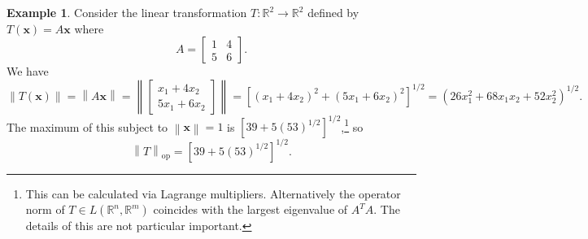 \documentclass{article}
\newcommand{\R}{\mathbb{R}}
\newcommand{\x}{\mathbf{x}}
\newcommand{\norm}[1]{\left\lVert#1\right\rVert}
\theoremstyle{definition}
\newtheorem{example}{Example}[section]
\begin{document}
\begin{example}
	Consider the linear transformation $ T:\R^2\to\R^2 $ defined by $ T(\x)=A\x $ where $$ A = \begin{bmatrix}
		1 & 4\\ 5 & 6
	\end{bmatrix}. $$
We have 
$$\norm{T(\x)}=\norm{A\x}=\norm{\begin{bmatrix}
		x_1 + 4x_2\\ 5x_1 + 6x_2
\end{bmatrix}} = \left[(x_1 + 4x_2)^2 + (5x_1 + 6x_2)^2\right]^{1/2} = \left(26x_1^2 + 68 x_1x_2 + 52x_2^2\right)^{1/2}. $$ The maximum of this subject to $ \norm{\x} = 1 $ is $ \left[39+5(53)^{1/2}\right]^{1/2}$,\footnote{This can be calculated via Lagrange multipliers. Alternatively the operator norm of $ T\in L(\R^n,\R^m) $ coincides with the largest eigenvalue of $ A^TA $. The details of this are not particular important.} so $$ \norm{T}_\text{op}= \left[39+5(53)^{1/2}\right]^{1/2}.$$ 
\end{example}
\end{document}
